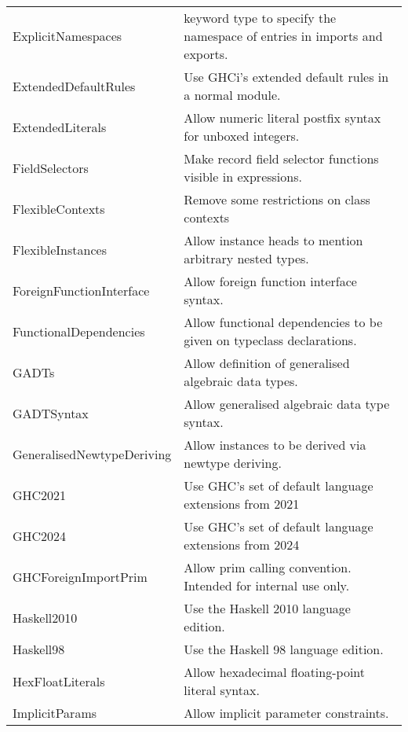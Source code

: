 \documentclass[openany, 12pt]{book}
\begin{document}
\begin{center}
\begin{supertabular}{ll}
		ExplicitNamespaces         & keyword type to specify the namespace of entries in imports and exports.   \\
		ExtendedDefaultRules       & Use GHCi's extended default rules in a normal module.                      \\
		ExtendedLiterals           & Allow numeric literal postfix syntax for unboxed integers.                 \\
		FieldSelectors             & Make record field selector functions visible in expressions.               \\
		FlexibleContexts           & Remove some restrictions on class contexts                                 \\
		FlexibleInstances          & Allow instance heads to mention arbitrary nested types.                    \\
		ForeignFunctionInterface   & Allow foreign function interface syntax.                                   \\
		FunctionalDependencies     & Allow functional dependencies to be given on typeclass declarations.       \\
		GADTs                      & Allow definition of generalised algebraic data types.                      \\
		GADTSyntax                 & Allow generalised algebraic data type syntax.                              \\
		GeneralisedNewtypeDeriving & Allow instances to be derived via newtype deriving.                        \\
		GHC2021                    & Use GHC’s set of default language extensions from 2021                     \\
		GHC2024                    & Use GHC’s set of default language extensions from 2024                     \\
		GHCForeignImportPrim       & Allow prim calling convention. Intended for internal use only.             \\
		Haskell2010                & Use the Haskell 2010 language edition.                                     \\
		Haskell98                  & Use the Haskell 98 language edition.                                       \\
		HexFloatLiterals           & Allow hexadecimal floating-point literal syntax.                           \\
		ImplicitParams             & Allow implicit parameter constraints.                                      \\

\end{supertabular}
\end{center}
\end{document}

